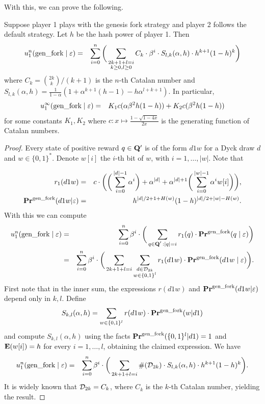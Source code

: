 With this, we can prove the following.
\begin{myprop*}
Suppose player 1 plays with the genesis fork strategy and player 2 follows the default strategy. Let $h$ be the hash power of player 1. Then
\begin{eqnarray*}
	u_1^n(\text{\rm gen\_fork} \mid \varepsilon) & = & \sum_{i=0}^{n} \bigg( \sum_{\substack{2k+1+l=i\\k\geq 0,l\geq 0}} C_k\cdot \beta^{i} \cdot S_{l,k}(\alpha,h)\cdot h^{k+1}(1-h)^{k} \bigg)
\end{eqnarray*}
where $C_k={2k\choose k}/(k+1)$ is the $n$-th Catalan number and $S_{l,k}(\alpha,h)=\frac{1}{1-\alpha}(1+\alpha^{k+1}(h-1)-h\alpha^{l+k+1})$. In particular,
\begin{eqnarray*}
	u_1^\infty(\text{\rm gen\_fork} \mid \varepsilon) & = & K_1 c(\alpha\beta^2h(1-h))+K_2 c(\beta^2h(1-h))
\end{eqnarray*}
for some constants $K_1,K_2$ where $c:x\mapsto \frac{1-\sqrt{1-4x}}{2x}$ is the generating function of Catalan numbers.

\end{myprop*}
\begin{proof} Every state of positive reward $q\in\mathbf{Q}'$ is of the form $d1w$ for a Dyck draw $d$ and $w\in \{0,1\}^\ast$. Denote $w[i]$ the $i$-th bit of $w$, with $i=1,\dots,|w|$. Note that

\begin{eqnarray*}
r_1(d1w) &=& c\cdot \bigg(\bigg(\sum_{i=0}^{|d|-1}\alpha^i \bigg)+\alpha^{|d|}+\alpha^{|d|+1}\bigg(\sum_{i=0}^{|w|-1}\alpha^i w[i]\bigg)\bigg),\\
\mathbf{Pr}^{\text{\rm gen\_fork}}(d1w|\varepsilon) &=& h^{|d|/2+1+H(w)}(1-h)^{|d|/2+|w|-H(w)}.
\end{eqnarray*} 
With this we can compute 
\begin{eqnarray*}
	u_1^n(\text{\rm gen\_fork} \mid \varepsilon) & = & \sum_{i=0}^{n}\beta^{i} \cdot  \bigg(\sum_{\substack{q \in \mathbf{Q}' \,: |q| = i}} r_1(q) \cdot 
	\mathbf{Pr}^{\text{\rm gen\_fork}}(q \mid \varepsilon)\bigg)\\
								& = & \sum_{i=0}^{n}\beta^{i} \cdot  \bigg(\sum_{2k+1+l=i}\sum_{\substack{d\in \mathcal{D}_{2k}\\w\in\{0,1\}^l}} r_1(d1w) \cdot 
	\mathbf{Pr}^{\text{\rm gen\_fork}}(d1w \mid \varepsilon)\bigg).
\end{eqnarray*}
First note that in the inner sum, the expressions $r(d1w)$ and $\mathbf{Pr}^{\text{\rm gen\_fork}}(d1w|\varepsilon)$ depend only in $k,l$. Define
$$S_{k,l}(\alpha,h)=\sum_{w\in\{0,1\}^l}r(d1w)\cdot \mathbf{Pr}^{\text{\rm gen\_fork}}(w|d1)$$
and compute $S_{k,l}(\alpha,h)$ using the facts $\mathbf{Pr}^{\text{\rm gen\_fork}}(\{0,1\}^l|d1)=1$ and $\mathbf{E}(w[i])=h$ for every $i=1,\dots,l$, obtaining the claimed expression. We have
\begin{eqnarray*}
u_1^n(\text{\rm gen\_fork} \mid \varepsilon) & = & \sum_{i=0}^{n}\beta^{i} \cdot  \bigg(\sum_{2k+1+l=i} \#(\mathcal{D}_{2k})\cdot S_{l,k}(\alpha,h)\cdot h^{k+1}(1-h)^{k}\bigg).
\end{eqnarray*}
It is widely known that $\mathcal{D}_{2k}=C_k$, where $C_k$ is the $k$-th Catalan number, yielding the result. 
\end{proof}


